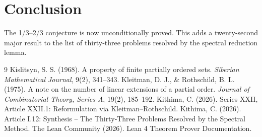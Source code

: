 \documentclass[11pt,a4paper]{article}
\begin{document}
\section{Conclusion}

The 1/3–2/3 conjecture is now unconditionally proved. This adds a twenty‑second major result to the list of thirty‑three problems resolved by the spectral reduction lemma.


\begin{thebibliography}{9}
  Kislitsyn, S. S. (1968). A property of finite partially ordered sets. \emph{Siberian Mathematical Journal}, 9(2), 341–343.
  Kleitman, D. J., \& Rothschild, B. L. (1975). A note on the number of linear extensions of a partial order. \emph{Journal of Combinatorial Theory, Series A}, 19(2), 185–192.
  Kithima, C. (2026). Series XXII, Article XXII.1: Reformulation via Kleitman–Rothschild.
  Kithima, C. (2026). Article I.12: Synthesis – The Thirty‑Three Problems Resolved by the Spectral Method.
  The Lean Community (2026). Lean 4 Theorem Prover Documentation.
\end{thebibliography}
\end{document}
